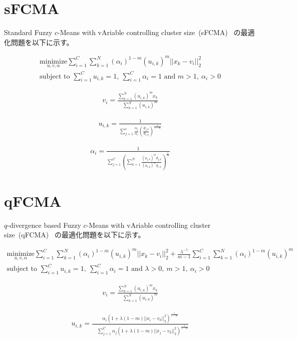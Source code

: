 \documentclass[a4j,12pt,dvipdfmx,oneside]{jsbook}
\theoremstyle{definition}
\begin{document}
\section{sFCMA}\label{sec:sfcma}
%
Standard Fuzzy $c$-Means with vAriable controlling cluster size~(sFCMA)~\cite{sFCMA}
の最適化問題を以下に示す。

\begin{align}
 \underset{u,v,\alpha}{\text{minimize}}
 \sum_{i=1}^C\sum_{k=1}^N(\alpha_{i})^{1-m}(u_{i,k})^m||x_k-v_i||_2^2\\
 {\text{subject to }}\sum_{i=1}^Cu_{i,k}=1,~\sum_{i=1}^C\alpha_{i}=1{\text{ and }}m>1,~\alpha_{i}>0
\end{align}
 
\begin{align}
   v_{i}=\frac{\sum_{k=1}^N(u_{i,k})^mx_{k}}{\quad\sum_{k=1}^N(u_{i,k})^{m}}
\end{align}

\begin{align}
   u_{i,k}=\frac{1}{\sum_{j=1}^c\frac{\alpha_{j}}{\alpha_{i}}\left(\frac{d_{j,k}}{d_{i,k}}\right)^\frac{1}{1-m}}
\end{align}

\begin{align}
    \alpha_{i}=\frac{1}{\sum_{j=1}^C\left(\sum_{k=1}^N\frac{(u_{j,k})^md_{j,k}}{(u_{i,k})^md_{i,k}}\right)^{\frac{1}{m}}}
\end{align}
  
\section{qFCMA}\label{sec:qfcma}
%
$q$-divergence based Fuzzy $c$-Means with vAriable controlling cluster size~(qFCMA)~\cite{qFCMA}
の最適化問題を以下に示す。

\begin{align}
 \underset{u,v,\alpha}{\text{minimize}}
 \sum_{i=1}^C\sum_{k=1}^N(\alpha_{i})^{1-m}(u_{i,k})^m||x_k-v_i||_2^2
 +\frac{\lambda^{-1}}{m-1}\sum_{i=1}^C\sum_{k=1}^N(\alpha_{i})^{1-m}(u_{i,k})^m\\
 {\text{subject to }}\sum_{i=1}^Cu_{i,k}=1,~\sum_{i=1}^C\alpha_{i}=1{\text{ and }}\lambda>0,~m>1,~\alpha_{i}>0
\end{align}

\begin{align}
  v_{i}=\frac{\sum_{k=1}^N(u_{i,k})^mx_{k}}{\quad\sum_{k=1}^N(u_{i,k})^{m}}
\end{align}
    
\begin{align}
  u_{i,k}=\frac{\alpha_{i}(1+\lambda(1-m)||x_i-v_k||_2^2)^\frac{1}{1-m}}{\quad\sum_{j=1}^C\alpha_{j}(1+\lambda(1-m)||x_j-v_k||_2^2)^\frac{1}{1-m}}
\end{align}
\end{document}
